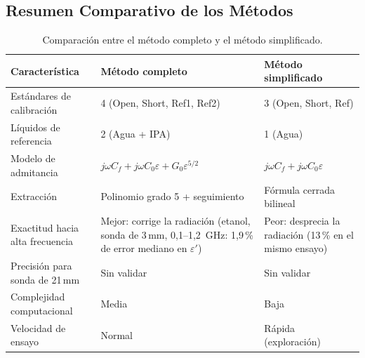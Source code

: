 \newpage
\Encabezado

\subsection{Resumen Comparativo de los Métodos}
\label{sec:resumen}

\begin{table}[h!]
\centering
\caption{Comparación entre el método completo y el método simplificado.}
\label{tab:comparacion_metodos}
\small
\begin{tabular}{@{}lp{5.2cm}p{4.4cm}@{}}
\toprule
\textbf{Característica}         & \textbf{Método completo}              & \textbf{Método simplificado} \\
\midrule
Estándares de calibración       & 4 (Open, Short, Ref1, Ref2)           & 3 (Open, Short, Ref) \\
Líquidos de referencia          & 2 (Agua + IPA)                        & 1 (Agua) \\
Modelo de admitancia            & $j\omega C_f + j\omega C_0\varepsilon + G_0\varepsilon^{5/2}$ & $j\omega C_f + j\omega C_0\varepsilon$ \\
Extracción                      & Polinomio grado 5 + seguimiento       & Fórmula cerrada bilineal \\
Exactitud hacia alta frecuencia & Mejor: corrige la radiación (etanol, sonda de 3\,mm, 0,1--1,2~GHz: 1,9\,\% de error mediano en $\varepsilon'$) & Peor: desprecia la radiación (13\,\% en el mismo ensayo) \\
Precisión para sonda de 21\,mm  & Sin validar                           & Sin validar \\
Complejidad computacional       & Media                                 & Baja \\
Velocidad de ensayo             & Normal                                & Rápida (exploración) \\
\bottomrule
\end{tabular}
\end{table}

